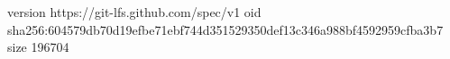 version https://git-lfs.github.com/spec/v1
oid sha256:604579db70d19efbe71ebf744d351529350def13c346a988bf4592959cfba3b7
size 196704
